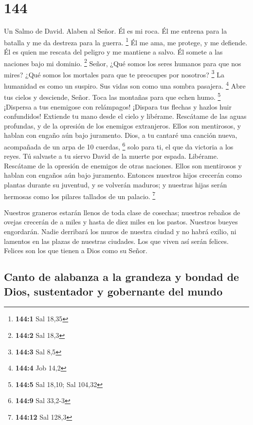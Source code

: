 \hypertarget{section-143}{%
\section{144}\label{section-143}}

Un Salmo de David.  Alaben al Señor. Él es mi roca. Él me
entrena para la batalla y me da destreza para la guerra. \footnote{\textbf{144:1}
  Sal 18,35}  Él me ama, me protege, y me defiende. Él es
quien me rescata del peligro y me mantiene a salvo. Él somete a las
naciones bajo mi dominio. \footnote{\textbf{144:2} Sal 18,3}
 Señor, ¿Qué somos los seres humanos para que nos mires?
¿Qué somos los mortales para que te preocupes por nosotros? \footnote{\textbf{144:3}
  Sal 8,5}  La humanidad es como un suspiro. Sus vidas son
como una sombra pasajera. \footnote{\textbf{144:4} Job 14,2}
 Abre tus cielos y desciende, Señor. Toca las montañas para
que echen humo. \footnote{\textbf{144:5} Sal 18,10; Sal 104,32}
 ¡Dispersa a tus enemigose con relámpagos! ¡Dispara tus
flechas y hazlos huir confundidos!  Extiende tu mano desde
el cielo y libérame. Rescátame de las aguas profundas, y de la opresión
de los enemigos extranjeros.  Ellos son mentirosos, y hablan
con engaño aún bajo juramento.  Dios, a tu cantaré una
canción nueva, acompañada de un arpa de 10 cuerdas, \footnote{\textbf{144:9}
  Sal 33,2-3}  solo para ti, el que da victoria a los
reyes. Tú salvaste a tu siervo David de la muerte por espada.
 Libérame. Rescátame de la opresión de enemigos de otras
naciones. Ellos son mentirosos y hablan con engaños aún bajo juramento.
 Entonces nuestros hijos crecerán como plantas durante su
juventud, y se volverán maduros; y nuestras hijas serán hermosas como
los pilares tallados de un palacio. \footnote{\textbf{144:12} Sal 128,3}

 Nuestros graneros estarán llenos de toda clase de
cosechas; nuestros rebaños de ovejas crecerán de a miles y hasta de diez
miles en los pastos.  Nuestros bueyes engordarán. Nadie
derribará los muros de nuestra ciudad y no habrá exilio, ni lamentos en
las plazas de nuestras ciudades.  Los que viven así serán
felices. Felices son los que tienen a Dios como su Señor.

\hypertarget{canto-de-alabanza-a-la-grandeza-y-bondad-de-dios-sustentador-y-gobernante-del-mundo}{%
\subsection{Canto de alabanza a la grandeza y bondad de Dios,
sustentador y gobernante del
mundo}\label{canto-de-alabanza-a-la-grandeza-y-bondad-de-dios-sustentador-y-gobernante-del-mundo}}

